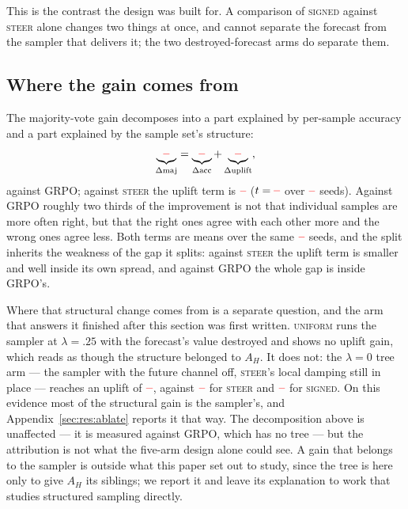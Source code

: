 \documentclass[11pt]{article}
\newcommand{\AH}{A_{H}}
\providecommand{\PENDING}{\textcolor{red}{\textbf{--}}}
\newcommand{\num}[1]{\ifcsname #1\endcsname\csname #1\endcsname\else\PENDING\fi}
\begin{document}
This is the contrast the design was built for. A comparison of \textsc{signed} against
\textsc{steer} alone changes two things at once, and cannot separate the forecast
from the sampler that delivers it; the two destroyed-forecast arms do separate them.

\subsection{Where the gain comes from}
\label{sec:res:decomp}

The majority-vote gain decomposes into a part explained by per-sample accuracy and a
part explained by the sample set's structure:
%
\begin{equation*}
\underbrace{\num{Csignedgrpomaj}}_{\Delta\mathrm{maj}}
=\underbrace{\num{Csignedgrpoacc}}_{\Delta\mathrm{acc}}
+\underbrace{\num{Csignedgrpouplift}}_{\Delta\mathrm{uplift}},
\end{equation*}
%
against GRPO; against \textsc{steer} the uplift term is
$\num{Csignedsteeruplift}$ ($t = \num{Tsignedsteeruplift}$ over
$\num{Nsignedsteer}$ seeds). Against GRPO roughly two thirds of the improvement is
not that individual samples are more often right, but that the right ones agree with
each other more and the wrong ones agree less. Both terms are
means over the same $\num{Nseedsused}$ seeds, and the split inherits the weakness of
the gap it splits: against \textsc{steer} the uplift term is smaller and well
inside its own spread, and against GRPO the whole gap is inside GRPO's.

Where that structural change comes from is a separate question, and the arm that
answers it finished after this section was first written. \textsc{uniform} runs the
sampler at $\lambda = .25$ with the forecast's value destroyed and shows no uplift
gain, which reads as though the structure belonged to $\AH$. It does not: the
$\lambda = 0$ tree arm --- the sampler with the future channel off, \textsc{steer}'s
local damping still in place --- reaches an uplift
of $\num{Rlamzerouplift}$, against $\num{Rsteeruplift}$ for \textsc{steer} and
$\num{Rsigneduplift}$ for \textsc{signed}. On this evidence most of the structural gain is
the sampler's, and Appendix~\ref{sec:res:ablate} reports it that way. The
decomposition above is unaffected --- it is measured against GRPO, which has no tree
--- but the attribution is not what the five-arm design alone could see. A gain that
belongs to the sampler is outside what this paper set out to study, since the tree is
here only to give $\AH$ its siblings; we report it and leave its explanation to work
that studies structured sampling directly.
\end{document}
